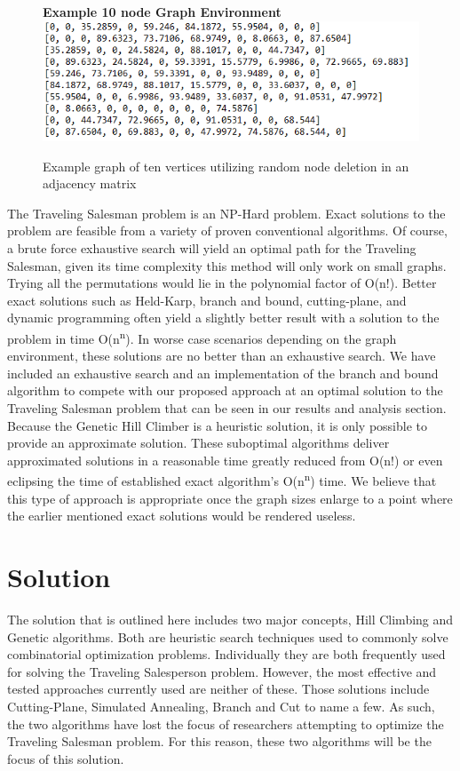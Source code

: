 \documentclass[sigplan,screen]{acmart}
\begin{document}
\begin{figure}[h]
    \centering
    \textbf{Example 10 node Graph Environment}
    \includegraphics[width=\columnwidth]{assets/graph.png}
    \caption{Example graph of ten vertices utilizing random node deletion in an adjacency matrix}
    \label{fig:example_graph}
\end{figure}

The Traveling Salesman problem is an NP-Hard problem. Exact solutions to the
problem are feasible from a variety of proven conventional algorithms. Of
course, a brute force exhaustive search will yield an optimal path for the
Traveling Salesman, given its time complexity this method will only work on
small graphs. Trying all the permutations would lie in the polynomial factor of
O(n!). Better exact solutions such as Held-Karp, branch and bound,
cutting-plane, and dynamic programming often yield a slightly better result with
a solution to the problem in time O(n\textsuperscript{n}). In worse case
scenarios depending on the graph environment, these solutions are no better than
an exhaustive search. We have included an exhaustive search and an
implementation of the branch and bound algorithm to compete with our proposed
approach at an optimal solution to the Traveling Salesman problem that can be
seen in our results and analysis section. Because the Genetic Hill Climber is a
heuristic solution, it is only possible to provide an approximate solution.
These suboptimal algorithms deliver approximated solutions in a reasonable time
greatly reduced from O(n!) or even eclipsing the time of established exact
algorithm’s O(n\textsuperscript{n}) time. We believe that this type of approach
is appropriate once the graph sizes enlarge to a point where the earlier
mentioned exact solutions would be rendered useless.

\section{Solution}
The solution that is outlined here includes two major concepts, Hill Climbing
and Genetic algorithms. Both are heuristic search techniques used to commonly
solve combinatorial optimization problems. Individually they are both frequently
used for solving the Traveling Salesperson problem. However, the most effective
and tested approaches currently used are neither of these. Those solutions
include Cutting-Plane, Simulated Annealing, Branch and Cut to name a few. As
such, the two algorithms have lost the focus of researchers attempting to
optimize the Traveling Salesman problem. For this reason, these two algorithms
will be the focus of this solution.
\end{document}
